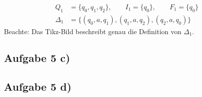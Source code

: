 \begin{align*}
	Q_1 &=\big\lbrace q_0,q_1,q_2\big\rbrace,\qquad I_1=\lbrace q_0\rbrace,\qquad F_1=\lbrace q_0\rbrace\\
	\Delta_1&=\big\lbrace(q_0,a,q_1),(q_1,a,q_2),(q_2,a,q_0)\big\rbrace
\end{align*}
Beachte: Das Tikz-Bild beschreibt genau die Definition von $\Delta_1$.
\subsection*{Aufgabe 5 c)}
\subsection*{Aufgabe 5 d)}
